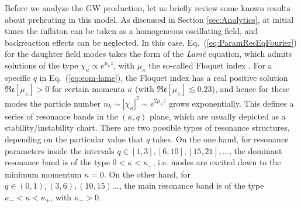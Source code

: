 \documentclass[a4paper,11pt]{article}
\begin{document}
Before we analyze the GW production, let us briefly review some known results about preheating in this model. As discussed in Section \ref{sec:Analytics}, at initial times the inflaton can be taken as a homogeneous oscillating field, and backreaction effects can be neglected. In this case, Eq.~(\ref{eq:ParamResEqFourier}) for the daughter field modes takes the form of the \textit{Lam\'e} equation, which admits solutions of the type $\chi_{\kappa} \propto e^{\mu_{\kappa} z}$, with $\mu_{\kappa}$ the so-called Floquet index \cite{Greene:1997fu}. For a specific $q$ in Eq.~(\ref{eq:eom-lame}), the Floquet index has a real positive solution $\mathfrak{Re} [\mu_{\kappa}] > 0$  for certain momenta $\kappa$ (with $\mathfrak{Re} [\mu_{\kappa}]\lesssim 0.23$), and hence for these modes the particle number $n_k \sim |\chi_{\kappa}|^2 \sim e^{2\mu_{\kappa} z}$ grows exponentially. This defines a series of resonance bands in the $(\kappa,q)$ plane, which are usually depicted as a stability/instability chart. There are two possible types of resonance structures, depending on the particular value that $q$ takes. On the one hand, for resonance parameters inside the intervals $q \in [1,3], [6,10], [15,21], \dots$, the dominant resonance band is of the type $0 < \kappa < \kappa_+$, i.e. modes are excited down to the minimum momentum $\kappa=0$. On the other hand, for $q \in (0,1),(3,6),(10,15) \dots$, the main resonance band is of the type $\kappa_- < \kappa < \kappa_+$, with $\kappa_- > 0$.
\end{document}
